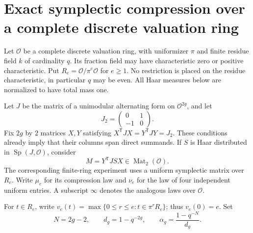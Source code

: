 \section{Exact symplectic compression over a complete discrete valuation ring}
\label{sec:padic-exact}

Let $\mathcal O$ be a complete discrete valuation ring, with uniformizer
$\pi$ and finite residue field $k$ of cardinality $q$. Its fraction field
may have characteristic zero or positive characteristic. Put
$R_e=\mathcal O/\pi^e\mathcal O$ for $e\geq1$. No restriction is placed
on the residue characteristic, in particular $q$ may be even.
All Haar measures below are normalized to have total mass one.

Let $J$ be the matrix of a unimodular alternating form on
$\mathcal O^{2g}$, and let
\[
 J_2=\begin{pmatrix}0&1\\-1&0\end{pmatrix}.
\]
Fix $2g$ by $2$ matrices $X,Y$ satisfying
$X^{\mathsf T}JX=Y^{\mathsf T}JY=J_2$. These conditions already imply
that their columns span direct summands. If $S$ is Haar distributed in
$\operatorname{Sp}(J,\mathcal O)$, consider
\begin{equation}\label{eq:padic-M}
 M=Y^{\mathsf T}JSX\in\operatorname{Mat}_2(\mathcal O).
\end{equation}
The corresponding finite-ring experiment uses a uniform symplectic
matrix over $R_e$. Write $\mu_e$ for its compression law and $\nu_e$
for the law of four independent uniform entries. A subscript $\infty$
denotes the analogous laws over $\mathcal O$.

For $t\in R_e$, write $v_e(t)=\max\{0\leq r\leq e:t\in\pi^rR_e\}$;
thus $v_e(0)=e$. Set
\[
 N=2g-2,\qquad d_g=1-q^{-2g},\qquad
 \alpha_g=\frac{1-q^{-N}}{d_g}.
\]

